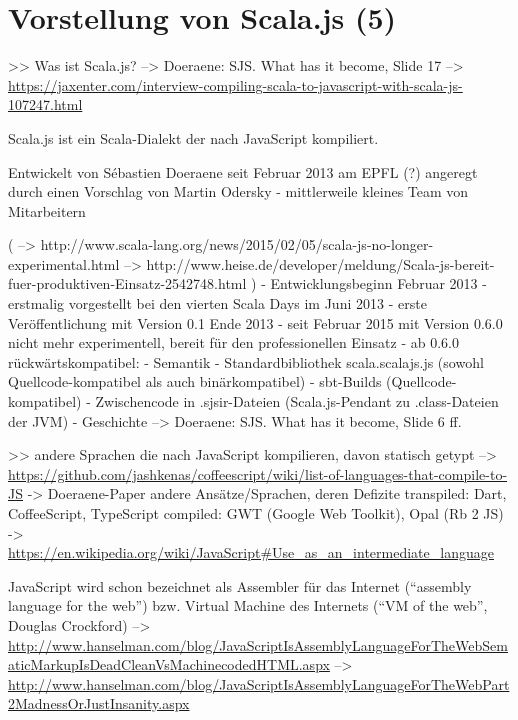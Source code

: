 \documentclass[a4paper, 12pt, listof=totoc, bibliography=totoc]{scrreprt}
\begin{document}
\chapter{Vorstellung von Scala.js (5)}




>> Was ist Scala.js?
-->  Doeraene: SJS. What has it become, Slide 17 %
-->  \url{https://jaxenter.com/interview-compiling-scala-to-javascript-with-scala-js-107247.html}

Scala.js ist ein Scala-Dialekt der nach JavaScript kompiliert.\cite[S. 1]{doeraene2013.TDI}

Entwickelt von Sébastien Doeraene seit Februar 2013 am EPFL (?) angeregt durch einen Vorschlag von Martin Odersky
- mittlerweile kleines Team von Mitarbeitern
\cite{doeraene2013.CSJ}


(
  -->  http://www.scala-lang.org/news/2015/02/05/scala-js-no-longer-experimental.html
  -->  http://www.heise.de/developer/meldung/Scala-js-bereit-fuer-produktiven-Einsatz-2542748.html
)
- Entwicklungsbeginn Februar 2013
- erstmalig vorgestellt bei den vierten Scala Days im Juni 2013
- erste Veröffentlichung mit Version 0.1 Ende 2013
- seit Februar 2015 mit Version 0.6.0 nicht mehr experimentell, bereit für den professionellen Einsatz
  - ab 0.6.0 rückwärtskompatibel:
    - Semantik
    - Standardbibliothek scala.scalajs.js (sowohl Quellcode-kompatibel als auch binärkompatibel)
    - sbt-Builds (Quellcode-kompatibel)
  - Zwischencode in .sjsir-Dateien (Scala.js-Pendant zu .class-Dateien der JVM)  
- Geschichte
-->  Doeraene: SJS. What has it become, Slide 6 ff.








>> andere Sprachen die nach JavaScript kompilieren, davon statisch getypt  -->  \url{https://github.com/jashkenas/coffeescript/wiki/list-of-languages-that-compile-to-JS}
-> Doeraene-Paper
andere Ansätze/Sprachen, deren Defizite
 transpiled:
   Dart, CoffeeScript, TypeScript
 compiled:
   GWT (Google Web Toolkit), Opal (Rb 2 JS)
-> \url{https://en.wikipedia.org/wiki/JavaScript#Use_as_an_intermediate_language}

JavaScript wird schon bezeichnet als Assembler für das Internet ("`assembly language for the web"') bzw. Virtual Machine des Internets ("`VM of the web"', Douglas Crockford)
  -->  \url{http://www.hanselman.com/blog/JavaScriptIsAssemblyLanguageForTheWebSematicMarkupIsDeadCleanVsMachinecodedHTML.aspx}
  --> \url{http://www.hanselman.com/blog/JavaScriptIsAssemblyLanguageForTheWebPart2MadnessOrJustInsanity.aspx}
\end{document}
